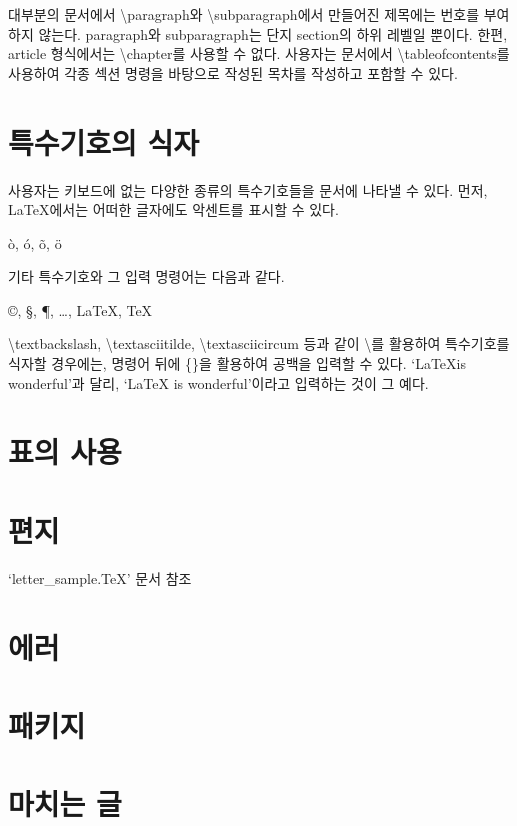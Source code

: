 \documentclass[a4paper, titlepage]{article}
\begin{document}
대부분의 문서에서 \textbackslash paragraph와 \textbackslash subparagraph에서 만들어진 제목에는 번호를 부여하지 않는다. 
paragraph와 subparagraph는 단지 section의 하위 레벨일 뿐이다. 한편, article 형식에서는 \textbackslash chapter를 사용할 수 없다.
사용자는 문서에서 \textbackslash tableofcontents를 사용하여 각종 섹션 명령을 바탕으로 작성된 목차를 작성하고 포함할 수 있다. 

\section{특수기호의 식자}
사용자는 키보드에 없는 다양한 종류의 특수기호들을 문서에 나타낼 수 있다. 
먼저, \LaTeX{}에서는 어떠한 글자에도 악센트를 표시할 수 있다. 
\begin{center}
\`{o}, \'{o}, \~{o}, \"{o} 
\end{center}
기타 특수기호와 그 입력 명령어는 다음과 같다. 
\begin{center}
\copyright, \S, \P, \ldots, \LaTeX, \TeX
\end{center}
\textbackslash textbackslash, \textbackslash textasciitilde, \textbackslash textasciicircum 등과 같이 \textbackslash{}를 활용하여 특수기호를 식자할 경우에는, 명령어 뒤에 \{\}을 활용하여 공백을 입력할 수 있다.
`\LaTeX is wonderful'과 달리, `\LaTeX{} is wonderful'이라고 입력하는 것이 그 예다. 

\section{표의 사용}

\section{편지}
`letter\_sample.\TeX' 문서 참조

\section{에러}

\section{패키지}

\section{마치는 글}
\end{document}
